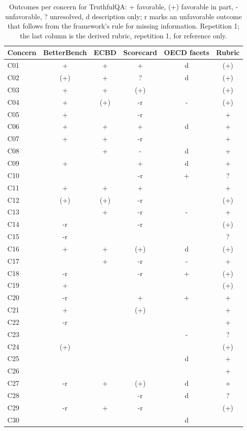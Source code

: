\begin{table}[t]
\caption{Outcomes per concern for TruthfulQA: + favorable, (+) favorable in part, - unfavorable, ? unresolved, d description only; r marks an unfavorable outcome that follows from the framework's rule for missing information. Repetition 1; the last column is the derived rubric, repetition 1, for reference only.}
\label{tab:grid-truthfulqa}
\small\centering\begin{tabular}{lccccc}\toprule
Concern & BetterBench & ECBD & Scorecard & OECD facets & Rubric \\
\midrule
C01 & + & + & + & d & (+) \\
C02 & (+) & + & ? & d & (+) \\
C03 & + & + & (+) &  & (+) \\
C04 & + & (+) & -r & - & (+) \\
C05 & + &  & -r &  & + \\
C06 & + & + & + & d & + \\
C07 & + & + & -r &  & + \\
C08 &  & + & - & d & + \\
C09 & + &  & + & d & + \\
C10 &  &  & -r & + & ? \\
C11 & + & + & + &  & + \\
C12 & (+) & (+) & -r &  & (+) \\
C13 &  & + & -r & - & + \\
C14 & -r &  & -r &  & (+) \\
C15 & -r &  &  &  & ? \\
C16 & + & + & (+) & d & (+) \\
C17 &  & + & -r & - & + \\
C18 & -r &  & -r & + & (+) \\
C19 & + &  &  &  & (+) \\
C20 & -r &  & + & + & + \\
C21 & + &  & (+) &  & + \\
C22 & -r &  &  &  & + \\
C23 &  &  &  & - & ? \\
C24 & (+) &  &  &  & (+) \\
C25 &  &  &  & d & + \\
C26 &  &  &  &  & + \\
C27 & -r & + & (+) & d & + \\
C28 &  &  & -r & d & ? \\
C29 & -r & + & -r &  & (+) \\
C30 &  &  &  & d &  \\
\bottomrule\end{tabular}
\end{table}
